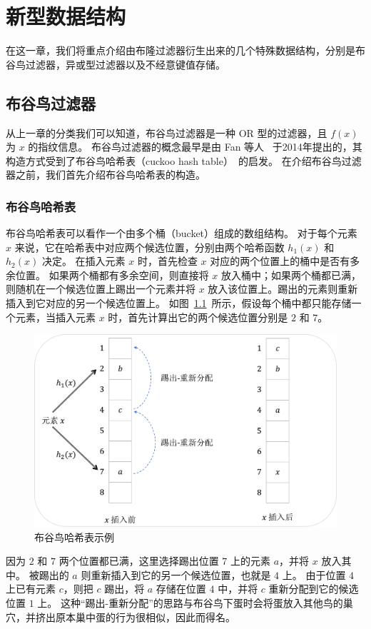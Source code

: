 
\chapter{新型数据结构}\label{chp:data_structure}

在这一章，我们将重点介绍由布隆过滤器衍生出来的几个特殊数据结构，分别是布谷鸟过滤器，异或型过滤器以及不经意键值存储。

\section{布谷鸟过滤器}

从上一章的分类我们可以知道，布谷鸟过滤器是一种 OR 型的过滤器，且 $f(x)$ 为 $x$ 的指纹信息。
布谷鸟过滤器的概念最早是由 Fan 等人~\cite{fan2014cuckoo} 于2014年提出的，其构造方式受到了布谷鸟哈希表（cuckoo hash table）~\cite{pagh2004cuckoo}的启发。
在介绍布谷鸟过滤器之前，我们首先介绍布谷鸟哈希表的构造。

\subsection{布谷鸟哈希表}

布谷鸟哈希表可以看作一个由多个桶（bucket）组成的数组结构。
对于每个元素 $x$ 来说，它在哈希表中对应两个候选位置，分别由两个哈希函数 $h_1(x)$ 和 $h_2(x)$ 决定。
在插入元素 $x$ 时，首先检查 $x$ 对应的两个位置上的桶中是否有多余位置。
如果两个桶都有多余空间，则直接将 $x$ 放入桶中；如果两个桶都已满，则随机在一个候选位置上踢出一个元素并将 $x$ 放入该位置上。踢出的元素则重新插入到它对应的另一个候选位置上。
如图~\ref{fig:cuckoo_example}~所示，假设每个桶中都只能存储一个元素，当插入元素 $x$ 时，首先计算出它的两个候选位置分别是 $2$ 和 $7$。
\begin{figure}[ht]
  \centering
  \includegraphics[width=\textwidth]{figures/ckh_exp.pdf}
  \caption{布谷鸟哈希表示例}
  \label{fig:cuckoo_example}
\end{figure}
因为 $2$ 和 $7$ 两个位置都已满，这里选择踢出位置 $7$ 上的元素 $a$，并将 $x$ 放入其中。
被踢出的 $a$ 则重新插入到它的另一个候选位置，也就是 $4$ 上。
由于位置 $4$ 上已有元素 $c$，则把 $c$ 踢出，将 $a$ 存储在位置 $4$ 中，并将 $c$ 重新分配到它的候选位置 $1$ 上。
这种``踢出-重新分配''的思路与布谷鸟下蛋时会将蛋放入其他鸟的巢穴，并挤出原本巢中蛋的行为很相似，因此而得名。

